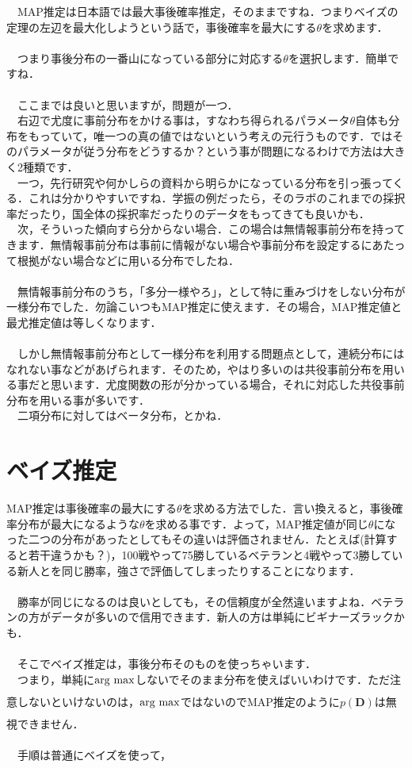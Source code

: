 \documentclass[11pt,a4paper,uplatex]{ujreport} 	%
\newcommand{\argmax}{\mathop{\rm arg~max}\limits}
\begin{document}
　MAP推定は日本語では最大事後確率推定，そのままですね．つまりベイズの定理の左辺を最大化しようという話で，事後確率を最大にする$\theta$を求めます．\\
\\
　つまり事後分布の一番山になっている部分に対応する$\theta$を選択します．簡単ですね．\\
\\
　ここまでは良いと思いますが，問題が一つ．\\
　右辺で尤度に事前分布をかける事は，すなわち得られるパラメータ$\theta$自体も分布をもっていて，唯一つの真の値ではないという考えの元行うものです．ではそのパラメータが従う分布をどうするか？という事が問題になるわけで方法は大きく2種類です．\\
　一つ，先行研究や何かしらの資料から明らかになっている分布を引っ張ってくる．これは分かりやすいですね．学振の例だったら，そのラボのこれまでの採択率だったり，国全体の採択率だったりのデータをもってきても良いかも．\\
　次，そういった傾向すら分からない場合．この場合は無情報事前分布を持ってきます．無情報事前分布は事前に情報がない場合や事前分布を設定するにあたって根拠がない場合などに用いる分布でしたね．\\
\\
　無情報事前分布のうち，「多分一様やろ」，として特に重みづけをしない分布が一様分布でした．勿論こいつもMAP推定に使えます．その場合，MAP推定値と最尤推定値は等しくなります．\\
\\
　しかし無情報事前分布として一様分布を利用する問題点として，連続分布にはなれない事などがあげられます．そのため，やはり多いのは共役事前分布を用いる事だと思います．尤度関数の形が分かっている場合，それに対応した共役事前分布を用いる事が多いです．\\
　二項分布に対してはベータ分布，とかね．

\section{ベイズ推定}
MAP推定は事後確率の最大にする$\theta$を求める方法でした．言い換えると，事後確率分布が最大になるような$\theta$を求める事です．よって，MAP推定値が同じ$\theta$になった二つの分布があったとしてもその違いは評価されません．たとえば(計算すると若干違うかも？)，100戦やって75勝しているベテランと4戦やって3勝している新人とを同じ勝率，強さで評価してしまったりすることになります．\\
\\
　勝率が同じになるのは良いとしても，その信頼度が全然違いますよね．ベテランの方がデータが多いので信用できます．新人の方は単純にビギナーズラックかも．\\
\\
　そこでベイズ推定は，事後分布そのものを使っちゃいます．\\
　つまり，単純に$\argmax_{}$しないでそのまま分布を使えばいいわけです．ただ注意しないといけないのは，$\argmax_{}$ではないのでMAP推定のように$p(\mathbf{D})$は無視できません．\\
\\
　手順は普通にベイズを使って，
\end{document}

